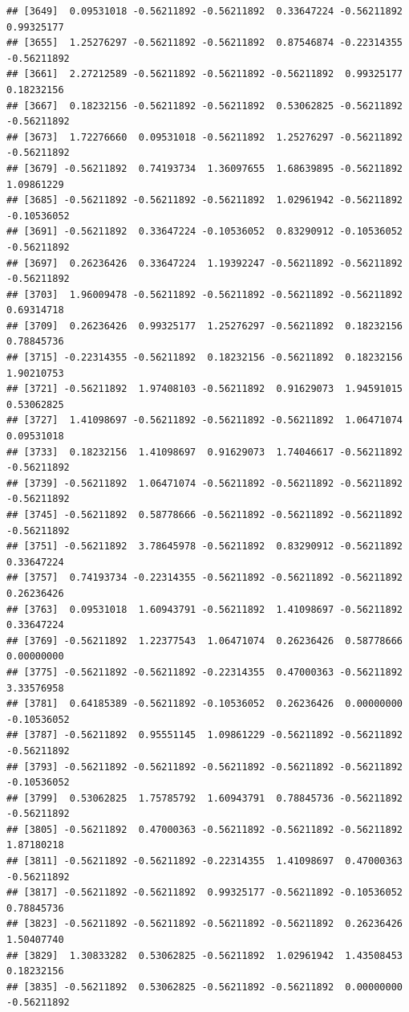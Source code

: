 \documentclass[
]{article}
\begin{document}
\begin{verbatim}
## [3649]  0.09531018 -0.56211892 -0.56211892  0.33647224 -0.56211892  0.99325177
## [3655]  1.25276297 -0.56211892 -0.56211892  0.87546874 -0.22314355 -0.56211892
## [3661]  2.27212589 -0.56211892 -0.56211892 -0.56211892  0.99325177  0.18232156
## [3667]  0.18232156 -0.56211892 -0.56211892  0.53062825 -0.56211892 -0.56211892
## [3673]  1.72276660  0.09531018 -0.56211892  1.25276297 -0.56211892 -0.56211892
## [3679] -0.56211892  0.74193734  1.36097655  1.68639895 -0.56211892  1.09861229
## [3685] -0.56211892 -0.56211892 -0.56211892  1.02961942 -0.56211892 -0.10536052
## [3691] -0.56211892  0.33647224 -0.10536052  0.83290912 -0.10536052 -0.56211892
## [3697]  0.26236426  0.33647224  1.19392247 -0.56211892 -0.56211892 -0.56211892
## [3703]  1.96009478 -0.56211892 -0.56211892 -0.56211892 -0.56211892  0.69314718
## [3709]  0.26236426  0.99325177  1.25276297 -0.56211892  0.18232156  0.78845736
## [3715] -0.22314355 -0.56211892  0.18232156 -0.56211892  0.18232156  1.90210753
## [3721] -0.56211892  1.97408103 -0.56211892  0.91629073  1.94591015  0.53062825
## [3727]  1.41098697 -0.56211892 -0.56211892 -0.56211892  1.06471074  0.09531018
## [3733]  0.18232156  1.41098697  0.91629073  1.74046617 -0.56211892 -0.56211892
## [3739] -0.56211892  1.06471074 -0.56211892 -0.56211892 -0.56211892 -0.56211892
## [3745] -0.56211892  0.58778666 -0.56211892 -0.56211892 -0.56211892 -0.56211892
## [3751] -0.56211892  3.78645978 -0.56211892  0.83290912 -0.56211892  0.33647224
## [3757]  0.74193734 -0.22314355 -0.56211892 -0.56211892 -0.56211892  0.26236426
## [3763]  0.09531018  1.60943791 -0.56211892  1.41098697 -0.56211892  0.33647224
## [3769] -0.56211892  1.22377543  1.06471074  0.26236426  0.58778666  0.00000000
## [3775] -0.56211892 -0.56211892 -0.22314355  0.47000363 -0.56211892  3.33576958
## [3781]  0.64185389 -0.56211892 -0.10536052  0.26236426  0.00000000 -0.10536052
## [3787] -0.56211892  0.95551145  1.09861229 -0.56211892 -0.56211892 -0.56211892
## [3793] -0.56211892 -0.56211892 -0.56211892 -0.56211892 -0.56211892 -0.10536052
## [3799]  0.53062825  1.75785792  1.60943791  0.78845736 -0.56211892 -0.56211892
## [3805] -0.56211892  0.47000363 -0.56211892 -0.56211892 -0.56211892  1.87180218
## [3811] -0.56211892 -0.56211892 -0.22314355  1.41098697  0.47000363 -0.56211892
## [3817] -0.56211892 -0.56211892  0.99325177 -0.56211892 -0.10536052  0.78845736
## [3823] -0.56211892 -0.56211892 -0.56211892 -0.56211892  0.26236426  1.50407740
## [3829]  1.30833282  0.53062825 -0.56211892  1.02961942  1.43508453  0.18232156
## [3835] -0.56211892  0.53062825 -0.56211892 -0.56211892  0.00000000 -0.56211892

\end{verbatim}
\end{document}

